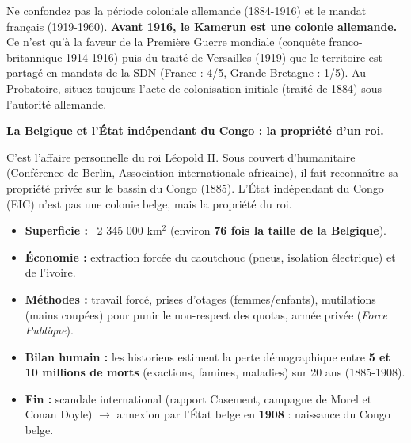 \documentclass[11pt]{article}
\newcommand{\cle}[1]{{\popxbold\color{popdark}#1}}
\begin{document}
\begin{attention}
Ne confondez pas la période coloniale allemande (1884-1916) et le mandat français (1919-1960). \textbf{Avant 1916, le Kamerun est une colonie allemande.} Ce n'est qu'à la faveur de la Première Guerre mondiale (conquête franco-britannique 1914-1916) puis du traité de Versailles (1919) que le territoire est partagé en mandats de la SDN (France : 4/5, Grande-Bretagne : 1/5). Au Probatoire, situez toujours l'acte de colonisation initiale (traité de 1884) sous l'autorité allemande.
\end{attention}

\textbf{La Belgique et l'État indépendant du Congo : la propriété d'un roi.}\par
C'est l'affaire personnelle du roi \cle{Léopold II}. Sous couvert d'humanitaire (Conférence de Berlin, Association internationale africaine), il fait reconnaître sa propriété privée sur le bassin du Congo (1885). L'\cle{État indépendant du Congo} (EIC) n'est pas une colonie belge, mais la propriété du roi.

\begin{exemplebox}
\begin{itemize}
    \item \textbf{Superficie :} ~2 345 000 km$^2$ (environ \textbf{76 fois la taille de la Belgique}).
    \item \textbf{Économie :} extraction forcée du \cle{caoutchouc} (pneus, isolation électrique) et de l'ivoire.
    \item \textbf{Méthodes :} travail forcé, prises d'otages (femmes/enfants), mutilations (mains coupées) pour punir le non-respect des quotas, armée privée (\emph{Force Publique}).
    \item \textbf{Bilan humain :} les historiens estiment la perte démographique entre \textbf{5 et 10 millions de morts} (exactions, famines, maladies) sur 20 ans (1885-1908).
    \item \textbf{Fin :} scandale international (rapport Casement, campagne de Morel et Conan Doyle) $\rightarrow$ annexion par l'État belge en \textbf{1908} : naissance du \cle{Congo belge}.
\end{itemize}
\end{exemplebox}
\end{document}
